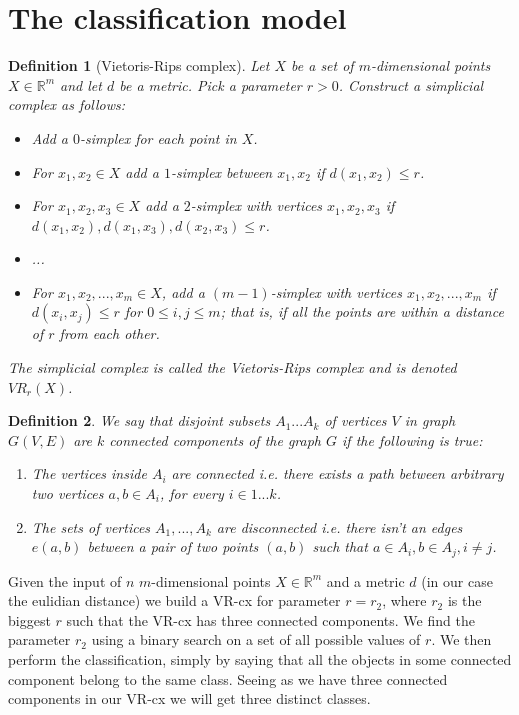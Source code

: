 \documentclass{article}
\newcommand{\enterProblemHeader}[1]{
}
\newcommand{\exitProblemHeader}[1]{
}
\newcounter{homeworkProblemCounter} %
\newcommand{\homeworkProblemName}{}
\newenvironment{homeworkProblem}[1][Problem \arabic{homeworkProblemCounter}]{ %
\stepcounter{homeworkProblemCounter} %
\renewcommand{\homeworkProblemName}{#1} %
\section{\homeworkProblemName} %
\enterProblemHeader{\homeworkProblemName} %
}{
\exitProblemHeader{\homeworkProblemName} %
}
\newtheorem{definition}{Definition}
\begin{document}
\begin{homeworkProblem}[The classification model]
 \label{prob:model}

\begin{definition}[Vietoris-Rips complex]
\label{defa}
Let $X$ be a set of $m$-dimensional points $X \in \mathbb{R}^{m}$ and let $d$ be a metric. Pick a parameter $r > 0$. Construct a simplicial complex as follows:
\begin{itemize}
	\item Add a $0$-simplex for each point in $X$.
	\item For $x_{1}, x_{2} \in X$ add a $1$-simplex between $x_{1}, x_{2}$ if $d(x_{1}, x_{2}) \leq r$.
	\item For $x_{1}, x_{2}, x_{3} \in X$ add a $2$-simplex with vertices $x_{1}, x_{2}, x_{3}$ if $d(x_{1}, x_{2}), d(x_{1}, x_{3}), d(x_{2}, x_{3}) \leq r$.
	\item ...
	\item For $x_{1}, x_{2}, ... , x_{m} \in X$, add a $(m-1)$-simplex with vertices $x_{1}, x_{2}, ..., x_{m}$ if $d(x_{i}, x_{j}) \leq r$ for $0 \leq i,j \leq m$; that is, if all the points are within a distance of $r$ from each other.
\end{itemize}
The simplicial complex is called the Vietoris-Rips complex and is denoted $VR_{r}(X)$.
\end{definition}

\begin{definition}
We say that disjoint subsets $A_{1}...A_{k}$ of vertices $V$ in graph $G(V,E)$ are $k$ connected components of the graph $G$ if the following is true:
\begin{enumerate}
	\item The vertices inside $A_{i}$ are connected i.e. there exists a path between arbitrary two vertices $a, b \in A_{i}$, for every $i \in 1...k$.
	\item The sets of vertices $A_{1},...,A_{k}$ are disconnected i.e. there isn't an edges $e(a, b)$ between a pair of two points $(a,b)$ such that $a \in A_{i}, b \in A_{j}, i \neq j$.
\end{enumerate}
\end{definition}

Given the input of $n$ $m$-dimensional points $X \in \mathbb{R}^{m}$ and a metric $d$ (in our case the eulidian distance) we build a VR-cx for parameter $r = r_{2}$, where $r_{2}$ is the biggest $r$ such that the VR-cx has three connected components. We find the parameter $r_{2}$ using a binary search on a set of all possible values of $r$. We then perform the classification, simply by saying that all the objects in some connected component belong to the same class. Seeing as we have three connected components in our VR-cx we will get three distinct classes.\\


\end{homeworkProblem}
\end{document}
